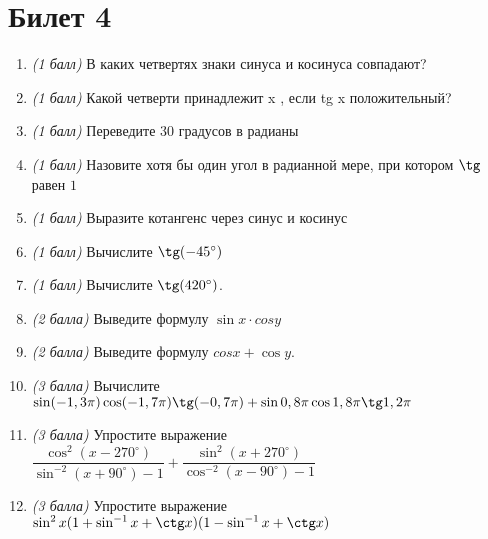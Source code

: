 \documentclass[12pt, a4paper]{article}
\begin{document}
	\section*{Билет 4}
	\begin{enumerate}
		\item \textit{(1 балл)}	В каких четвертях знаки синуса и косинуса совпадают? 
		\item \textit{(1 балл)}	Какой четверти принадлежит x , если tg x положительный?
		\item \textit{(1 балл)}	Переведите 30 градусов в радианы
		\item \textit{(1 балл)}	Назовите хотя бы один угол в радианной мере, при котором $\tg$  равен $1$
		\item \textit{(1 балл)} Выразите котангенс через синус и косинус
		\item \textit{(1 балл)} Вычислите $\tg (-45^{\circ})$
		\item \textit{(1 балл)}	Вычислите $\tg (420^{\circ})$.
		\item \textit{(2 балла)} Выведите формулу $\sin x \cdot cos y$ 
		\item \textit{(2 балла)} Выведите формулу $cos x + \cos y$.
		\item \textit{(3 балла)} Вычислите $\sin(-1,3\pi) \cos (-1,7 \pi) \tg (-0,7 \pi)+ \sin 0,8 \pi \cos 1,8 \pi \tg 1,2 \pi$
		\item \textit{(3 балла)} Упростите выражение $\dfrac{\cos^2 (x-270^{\circ})}{\sin^{-2}(x+90^{\circ})-1}+\dfrac{\sin^2 (x+270^{\circ})}{\cos^{-2}(x-90^{\circ})-1}$
		\item \textit{(3 балла)} Упростите выражение $\sin^2 x(1+\sin^{-1}x + \ctg x)(1 - \sin^{-1}x + \ctg x)$
	\end{enumerate}
	
	
	\newpage 
	
\end{document}
